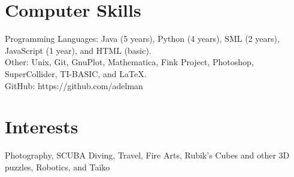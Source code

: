 \documentclass[11pt]{res} %
\begin{document}
\begin{resume}
 
\section{Computer Skills} 
Programming Languages: Java (5 years), Python (4 years), SML (2 years),
JavaScript (1 year), and HTML (basic).\\
Other: Unix, Git, GnuPlot, Mathematica, Fink Project, Photoshop, SuperCollider,
TI-BASIC, and \LaTeX.\\
GitHub: https://github.com/adelman

\section{Interests} 
Photography, SCUBA Diving, Travel, Fire Arts, Rubik's Cubes and other 3D
puzzles, Robotics, and Taiko 

\end{resume}
\end{document}
